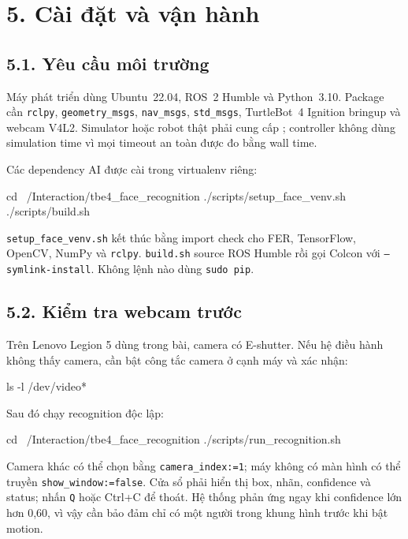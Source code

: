 \clearpage
\section*{5. Cài đặt và vận hành}

\subsection*{5.1. Yêu cầu môi trường}

Máy phát triển dùng Ubuntu~22.04, ROS~2 Humble và Python~3.10. Package cần
\texttt{rclpy}, \texttt{geometry\_msgs}, \texttt{nav\_msgs},
\texttt{std\_msgs}, TurtleBot~4 Ignition bringup và webcam V4L2. Simulator
hoặc robot thật phải cung cấp ; controller không dùng simulation
time vì mọi timeout an toàn được đo bằng wall time.

Các dependency AI được cài trong virtualenv riêng:

\begin{svcode}
cd ~/Interaction/tbe4_face_recognition
./scripts/setup_face_venv.sh
./scripts/build.sh
\end{svcode}

\texttt{setup\_face\_venv.sh} kết thúc bằng import check cho FER, TensorFlow,
OpenCV, NumPy và \texttt{rclpy}. \texttt{build.sh} source ROS Humble rồi gọi
Colcon với \texttt{--symlink-install}. Không lệnh nào dùng \texttt{sudo pip}.

\subsection*{5.2. Kiểm tra webcam trước}

Trên Lenovo Legion 5 dùng trong bài, camera có E-shutter. Nếu hệ điều hành
không thấy camera, cần bật công tắc camera ở cạnh máy và xác nhận:

\begin{svcode}
ls -l /dev/video*
\end{svcode}

Sau đó chạy recognition độc lập:

\begin{svcode}
cd ~/Interaction/tbe4_face_recognition
./scripts/run_recognition.sh
\end{svcode}

Camera khác có thể chọn bằng \texttt{camera\_index:=1}; máy không có màn hình
có thể truyền \texttt{show\_window:=false}. Cửa sổ phải hiển thị box, nhãn,
confidence và status; nhấn \texttt{Q} hoặc Ctrl+C để thoát. Hệ thống phản ứng
ngay khi confidence lớn hơn 0,60, vì vậy cần bảo đảm chỉ có một người trong
khung hình trước khi bật motion.

